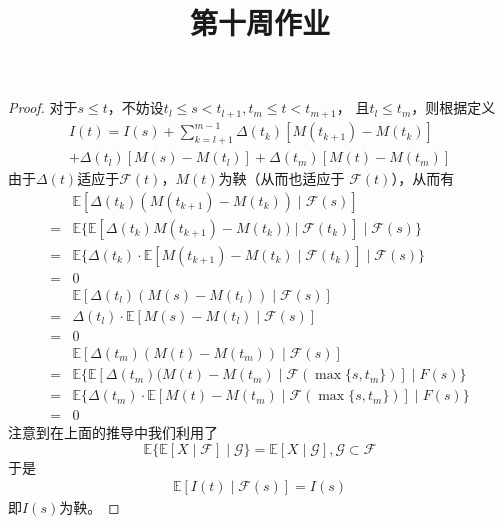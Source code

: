 \documentclass[cn]{homework}
\title{第十周作业}
\newcommand{\E}{\mathbb E}
\begin{document}
    \maketitle

    \problem[习题4.1]
    \begin{proof}
        对于$s\leq t$，不妨设$t_l\leq s<t_{l+1},t_m\leq t<t_{m+1}$，
        且$t_l\leq t_m$，则根据定义
        \begin{multline*}
            I(t)=I(s)+\sum_{k=l+1}^{m-1}\Delta(t_k)[M(t_{k+1})-M(t_k)]\\
            +\Delta(t_l)[M(s)-M(t_l)]+\Delta(t_m)[M(t)-M(t_m)]
        \end{multline*}
        由于$\Delta(t)$适应于$\mathcal F(t)$，$M(t)$为鞅（从而也适应于
        $\mathcal F(t)$），从而有
        \[\begin{aligned}
            &\E[\Delta(t_k)(M(t_{k+1})-M(t_k))\mid\mathcal F(s)]\\
            =&\E\{\E[\Delta(t_k)M(t_{k+1})-M(t_k))\mid\mathcal F(t_k)]\mid \mathcal F(s)\}\\
            =&\E\{\Delta(t_k)\cdot \E[M(t_{k+1})-M(t_k)\mid\mathcal F(t_k)]\mid\mathcal F(s)\}\\
            =&0\\
            &\E[\Delta(t_l)(M(s)-M(t_l))\mid\mathcal F(s)]\\
            =&\Delta(t_l)\cdot\E[M(s)-M(t_l)\mid\mathcal F(s)]\\
            =&0\\
            &\E[\Delta (t_m)(M(t)-M(t_m))\mid\mathcal F(s)]\\
            =&\E\{\E[\Delta(t_m)(M(t)-M(t_m)\mid\mathcal F(\max\{s,t_m\})]\mid F(s)\}\\
            =&\E\{\Delta(t_m)\cdot\E[M(t)-M(t_m)\mid\mathcal F(\max\{s,t_m\})]\mid F(s)\}\\
            =&0
        \end{aligned}\]
        注意到在上面的推导中我们利用了
        \[\E\{\E[X\mid \mathcal F]\mid\mathcal G\}=\E[X\mid\mathcal G],
        \mathcal G\subset \mathcal F\]
        于是
        \[\begin{aligned}
            \E[I(t)\mid\mathcal F(s)]=I(s)
        \end{aligned}\]
        即$I(s)$为鞅。
    \end{proof}
\end{document}

